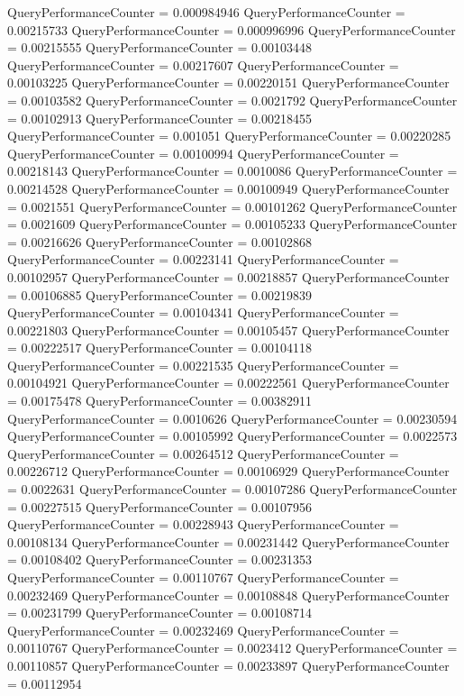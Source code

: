 \documentclass[9pt]{article}
\theoremstyle{plain}
\theoremstyle{definition}
\theoremstyle{remark}
\numberwithin{equation}{section}
\begin{document}
QueryPerformanceCounter  =  0.000984946
QueryPerformanceCounter  =  0.00215733
QueryPerformanceCounter  =  0.000996996
QueryPerformanceCounter  =  0.00215555
QueryPerformanceCounter  =  0.00103448
QueryPerformanceCounter  =  0.00217607
QueryPerformanceCounter  =  0.00103225
QueryPerformanceCounter  =  0.00220151
QueryPerformanceCounter  =  0.00103582
QueryPerformanceCounter  =  0.0021792
QueryPerformanceCounter  =  0.00102913
QueryPerformanceCounter  =  0.00218455
QueryPerformanceCounter  =  0.001051
QueryPerformanceCounter  =  0.00220285
QueryPerformanceCounter  =  0.00100994
QueryPerformanceCounter  =  0.00218143
QueryPerformanceCounter  =  0.0010086
QueryPerformanceCounter  =  0.00214528
QueryPerformanceCounter  =  0.00100949
QueryPerformanceCounter  =  0.0021551
QueryPerformanceCounter  =  0.00101262
QueryPerformanceCounter  =  0.0021609
QueryPerformanceCounter  =  0.00105233
QueryPerformanceCounter  =  0.00216626
QueryPerformanceCounter  =  0.00102868
QueryPerformanceCounter  =  0.00223141
QueryPerformanceCounter  =  0.00102957
QueryPerformanceCounter  =  0.00218857
QueryPerformanceCounter  =  0.00106885
QueryPerformanceCounter  =  0.00219839
QueryPerformanceCounter  =  0.00104341
QueryPerformanceCounter  =  0.00221803
QueryPerformanceCounter  =  0.00105457
QueryPerformanceCounter  =  0.00222517
QueryPerformanceCounter  =  0.00104118
QueryPerformanceCounter  =  0.00221535
QueryPerformanceCounter  =  0.00104921
QueryPerformanceCounter  =  0.00222561
QueryPerformanceCounter  =  0.00175478
QueryPerformanceCounter  =  0.00382911
QueryPerformanceCounter  =  0.0010626
QueryPerformanceCounter  =  0.00230594
QueryPerformanceCounter  =  0.00105992
QueryPerformanceCounter  =  0.0022573
QueryPerformanceCounter  =  0.00264512
QueryPerformanceCounter  =  0.00226712
QueryPerformanceCounter  =  0.00106929
QueryPerformanceCounter  =  0.0022631
QueryPerformanceCounter  =  0.00107286
QueryPerformanceCounter  =  0.00227515
QueryPerformanceCounter  =  0.00107956
QueryPerformanceCounter  =  0.00228943
QueryPerformanceCounter  =  0.00108134
QueryPerformanceCounter  =  0.00231442
QueryPerformanceCounter  =  0.00108402
QueryPerformanceCounter  =  0.00231353
QueryPerformanceCounter  =  0.00110767
QueryPerformanceCounter  =  0.00232469
QueryPerformanceCounter  =  0.00108848
QueryPerformanceCounter  =  0.00231799
QueryPerformanceCounter  =  0.00108714
QueryPerformanceCounter  =  0.00232469
QueryPerformanceCounter  =  0.00110767
QueryPerformanceCounter  =  0.0023412
QueryPerformanceCounter  =  0.00110857
QueryPerformanceCounter  =  0.00233897
QueryPerformanceCounter  =  0.00112954
\end{document}
